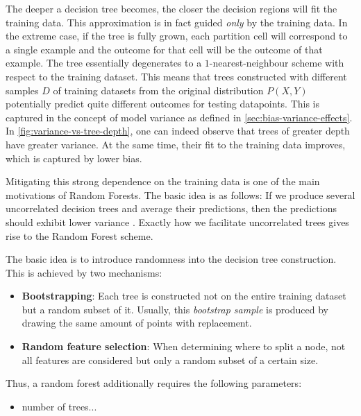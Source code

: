 \documentclass[../main.tex]{subfiles}
\begin{document}
The deeper a decision tree becomes, the closer the decision regions will fit the training data. This approximation is in fact guided \textit{only} by the training data. In the extreme case, if the tree is fully grown, each partition cell will correspond to a single example and the outcome for that cell will be the outcome of that example. The tree essentially degenerates to a $1$-nearest-neighbour scheme with respect to the training dataset. This means that trees constructed with different samples $D$ of training datasets from the original distribution $P(X,Y)$ potentially predict quite different outcomes for testing datapoints. This is captured in the concept of model variance as defined in \ref{sec:bias-variance-effects}. In \ref{fig:variance-vs-tree-depth}, one can indeed observe that trees of greater depth have greater variance. At the same time, their fit to the training data improves, which is captured by lower bias.

Mitigating this strong dependence on the training data is one of the main motivations of Random Forests. The basic idea is as follows: If we produce several uncorrelated decision trees and average their predictions, then the predictions should exhibit lower variance
.  Exactly how we facilitate uncorrelated trees gives rise to the Random Forest scheme.

The basic idea is to introduce randomness into the decision tree construction. This is achieved by two mechanisms:
\begin{itemize}
\item \textbf{Bootstrapping}: Each tree is constructed not on the entire training dataset but a random subset of it. Usually, this \textit{bootstrap sample} is produced by drawing the same amount of points with replacement.
\item \textbf{Random feature selection}: When determining where to split a node, not all features are considered but only a random subset of a certain size.
\end{itemize}

Thus, a random forest additionally requires the following parameters:
\begin{itemize}
\item number of trees...
\end{itemize}
\end{document}
